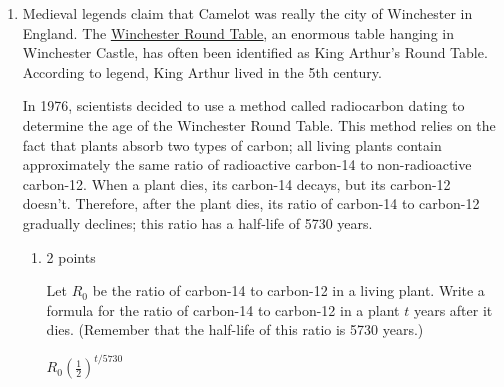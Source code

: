 \documentclass{article}
\makeatletter
\let\@href=\href
\renewcommand{\href}[2]{\@href{#1}{\ul{#2}}}
\makeatother
\begin{document}
\begin{enumerate}
\begin{enumerate}
\begin{enumerate}
      \begin{solution}
        For every additional 100 grams of vegetables you consume daily, your depression
        risk decreases by $3\%$ compared to your current depression risk, not your
        baseline depression risk. Since your depression risk goes down as you consume
        more vegetables, every $3\%$ decrease is a smaller amount compared to before.
        Thus, the percent decrease from consuming an additional
        500 grams of vegetables is less than $15\%$.
      \end{solution}

    \end{enumerate}
  \end{enumerate}

\item 

  Medieval legends claim that Camelot was really the city of Winchester in England. The \href{http://commons.wikimedia.org/wiki/File:Winchester_-_Table_ronde_du_roi_Arthur.JPG}{Winchester Round Table}, an enormous table hanging in Winchester Castle, has often been identified as King Arthur's Round Table. According to legend, King Arthur lived in the 5th century.

  In 1976, scientists decided to use a method called radiocarbon dating to determine the age of the Winchester Round Table. This method relies on the fact that plants absorb two types of carbon; all living plants contain approximately the same ratio of radioactive carbon-14 to non-radioactive carbon-12. When a plant dies, its carbon-14 decays, but its carbon-12 doesn't. Therefore, after the plant dies, its ratio of carbon-14 to carbon-12 gradually declines; this ratio has a half-life of 5730 years.

  \begin{enumerate}
  \item

    \begin{grading}
      2 points
    \end{grading}

    \begin{problem}[\vfill\newpage]
      Let $R_0$ be the ratio of carbon-14 to carbon-12 in a living plant. Write a formula for the ratio of carbon-14 to carbon-12 in a plant $t$ years after it dies. (Remember that the half-life of this ratio is 5730 years.)
    \end{problem}

    \begin{solution} 
      $R_0 (\frac{1}{2})^{t / 5730}$
    \end{solution}


\end{enumerate}
\end{enumerate}
\end{document}
